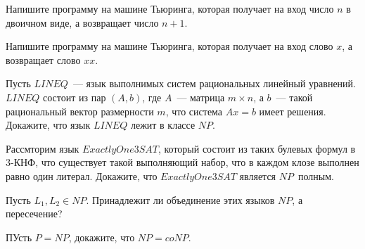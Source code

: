 \setcounter{curtask}{13}


\begin{task}
    Напишите программу на машине Тьюринга, которая получает на вход число $n$ в
    двоичном виде, а возвращает число $n + 1$.
\end{task}

\begin{task}
    Напишите программу на машине Тьюринга, которая получает на вход слово $x$, а
    возвращает слово $xx$.
\end{task}

\begin{task}
    Пусть $LINEQ$~--- язык выполнимых систем рациональных линейный уравнений. $LINEQ$
    состоит из пар $(A, b)$, где $A$~--- матрица $m \times n$, а $b$~--- такой
    рациональный вектор размерности $m$, что система $Ax = b$ имеет
    решения. Докажите, что язык $LINEQ$ лежит в классе $NP$.
\end{task}

\begin{task}
    Рассмторим язык $Exactly One 3SAT$, который состоит из таких булевых формул в
    $3$-КНФ, что существует такой выполняющий набор, что в каждом клозе выполнен
    равно один литерал. Докажите, что $Exactly One 3SAT$ является $NP$~полным.
\end{task}

\begin{task}
    Пусть $L_1, L_2 \in NP$. Принадлежит ли объединение этих языков $NP$, а
    пересечение?
\end{task}

\begin{task}
    ПУсть $P = NP$, докажите, что $NP = coNP$.
\end{task}